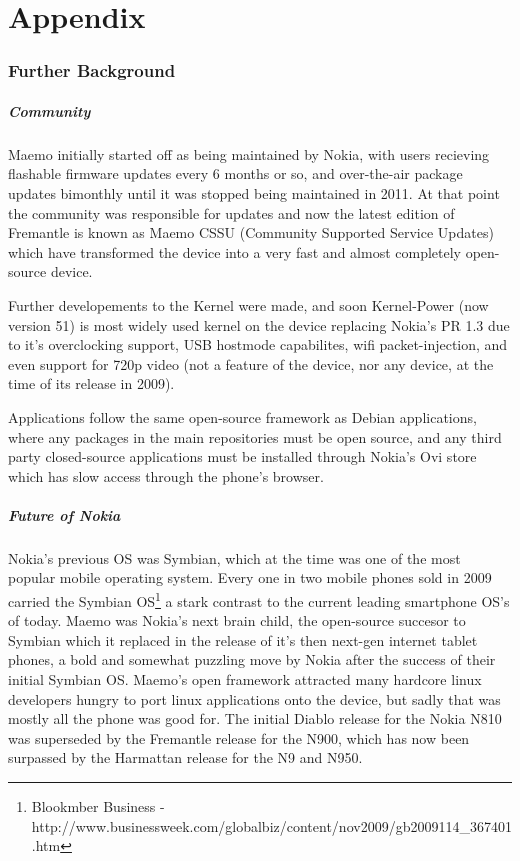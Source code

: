 \part{Appendix}
\section{Further Background}

\subsubsection{Community}\label{maemocomm}
Maemo initially started off as being maintained by Nokia, with users recieving flashable firmware updates every 6 months or so, and over-the-air package updates bimonthly until it was stopped being maintained in 2011. At that point the community was responsible for updates and now the latest edition of Fremantle is known as Maemo CSSU (Community Supported Service Updates) which have transformed the device into a very fast and almost completely open-source device.

Further developements to the Kernel were made, and soon Kernel-Power (now version 51)  is most widely used kernel on the device replacing Nokia's PR 1.3 due to it's overclocking support, USB hostmode capabilites, wifi packet-injection, and even support for 720p video (not a feature of the device, nor any device, at the time of its release in 2009).

Applications follow the same open-source framework as Debian applications, where any packages in the main repositories must be open source, and any third party closed-source applications must be installed through Nokia's Ovi store which has slow access through the phone's browser.


\subsubsection{Future of Nokia}
Nokia's previous OS was Symbian, which at the time was one of the most popular mobile operating system. Every one in two mobile phones sold in 2009 carried the Symbian OS\footnote{Blookmber Business - http://www.businessweek.com/globalbiz/content/nov2009/gb2009114\_367401.htm}\label{ref:blook} a stark contrast to the current leading smartphone OS's of today. Maemo was Nokia's next brain child, the open-source succesor to Symbian which it replaced in the release of  it's then next-gen internet tablet phones, a bold and somewhat puzzling move by Nokia after the success of their initial Symbian OS. Maemo's open framework attracted many hardcore linux developers hungry to port linux applications onto the device, but sadly that was mostly all the phone was good for. The initial Diablo release for the Nokia N810 was superseded by  the Fremantle release for the N900, which has now been surpassed by the Harmattan release for the N9 and N950.

